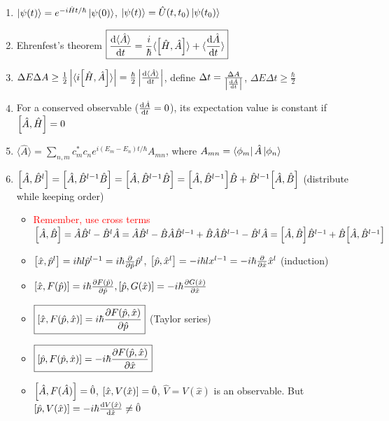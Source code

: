 \documentclass{article}
\theoremstyle{remark}
\theoremstyle{remark}
\begin{document}
\begin{enumerate}
    \item $\ket{\psi(t)}=e^{-i\hat{H}t/\hbar}\ket{\psi(0)}$, $\ket{\psi(t)}=\hat{U}(t,t_0)\ket{\psi(t_0)}$
    \item Ehrenfest's theorem $\boxed{\dv{\langle\hat{A}\rangle}{t}=\frac{i}{\hbar}\langle\comm{\hat{H}}{\hat{A}}\rangle+\langle\dv{\hat{A}}{t}\rangle}$
    \item $\Delta E\Delta A\geq\frac{1}{2}\left|\langle i\comm{\hat{H}}{\hat{A}}\rangle\right|=\frac{\hbar}{2}\left|\dv{\langle\hat{A}\rangle}{t}\right|$, define $\Delta t=\frac{\Delta A}{\left|\dv{\hat{A}}{t}\right|}$, $\Delta E\Delta t\geq\frac{\hbar}{2}$
    \item For a conserved observable ($\dv{\hat{A}}{t}=0$), its expectation value is constant if $\comm{\hat{A}}{\hat{H}}=0$
    \item $\langle\hat{A}\rangle=\sum_{n,m}c_m^*c_ne^{i(E_m-E_n)t/\hbar}A_{mn}$, where $A_{mn}=\bra{\phi_m}\hat{A}\ket{\phi_n}$
    \item $\comm{\hat{A}}{\hat{B}^l}=\comm{\hat{A}}{\hat{B}^{l-1}\hat{B}}=\comm{\hat{A}}{\hat{B}^{l-1}\hat{B}}=\comm{\hat{A}}{\hat{B}^{l-1}}\hat{B}+\hat{B}^{l-1}\comm{\hat{A}}{\hat{B}}$ (distribute while keeping order)\begin{itemize}
        \item \textcolor{red}{Remember, use cross terms} $\comm{\hat{A}}{\hat{B}}=\hat{A}\hat{B}^l-\hat{B}^l\hat{A}=\hat{A}\hat{B}^l-\hat{B}\hat{A}\hat{B}^{l-1}+\hat{B}\hat{A}\hat{B}^{l-1}-\hat{B}^l\hat{A}=\comm{\hat{A}}{\hat{B}}\hat{B}^{l-1}+\hat{B}\comm{\hat{A}}{\hat{B}^{l-1}}$
        \item $\comm{\hat{x}}{\hat{p}^l}=i\hbar l\hat{p}^{l-1}=i\hbar\pdv{\hat{p}}\hat{p}^l$, $\comm{\hat{p}}{\hat{x}^l}=-i\hbar lx^{l-1}=-i\hbar\pdv{\hat{x}}\hat{x}^l$ (induction)
        \item $\comm{\hat{x}}{F(\hat{p})}=i\hbar\pdv{F(\hat{p})}{\hat{p}}, \comm{\hat{p}}{G(\hat{x})}=-i\hbar\pdv{G(\hat{x})}{\hat{x}}$
        \item $\boxed{\comm{\hat{x}}{F(\hat{p},\hat{x})}=i\hbar\pdv{F(\hat{p},\hat{x})}{\hat{p}}}$ (Taylor series)
        \item $\boxed{\comm{\hat{p}}{F(\hat{p},\hat{x})}=-i\hbar\pdv{F(\hat{p},\hat{x})}{\hat{x}}}$
        \item $\comm{\hat{A}}{F(\hat{A})} = \hat{0}$, $\comm{\hat{x}}{V(\hat{x})}=\hat{0}$, $\hat{V}=V(\hat{x})$ is an observable. But $\comm{\hat{p}}{V(\hat{x})}=-i\hbar\dv{V(\hat{x})}{\hat{x}}\neq\hat{0}$
    \end{itemize}

\end{enumerate}
\end{document}
